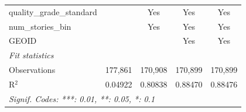 \begin{tabular}{lcccc}
   quality\_grade\_standard                                    &                 & Yes             & Yes             & Yes\\  
   num\_stories\_bin                                           &                 & Yes             & Yes             & Yes\\  
   GEOID                                                       &                 &                 & Yes             & Yes\\  
   \midrule
   \emph{Fit statistics}\\
   Observations                                                & 177,861         & 170,908         & 170,899         & 170,899\\  
   R$^2$                                                       & 0.04922         & 0.80838         & 0.88470         & 0.88476\\  
   \midrule \midrule
   \multicolumn{5}{l}{\emph{Signif. Codes: ***: 0.01, **: 0.05, *: 0.1}}\\
\end{tabular}
\par\endgroup
